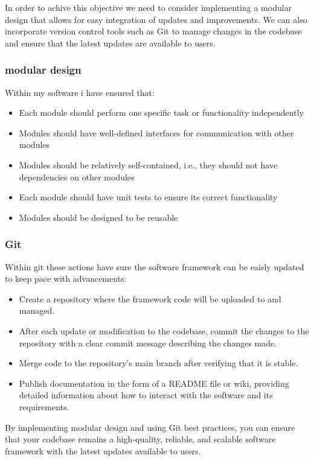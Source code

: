 \documentclass[]{final_report}
\begin{document}
In order to achive this objective we need to consider implementing a modular design that allows for easy integration of updates and improvements. We can also incorporate version control tools such as Git to manage changes in the codebase and ensure that the latest updates are available to users.

\subsubsection{modular design}
Within my software i have ensured that:

\begin{itemize}
    \item Each module should perform one specific task or functionality independently
    \item Modules should have well-defined interfaces for communication with other modules
    \item Modules should be relatively self-contained, i.e., they should not have dependencies on other modules
    \item Each module should have unit tests to ensure its correct functionality
    \item Modules should be designed to be reusable
\end{itemize}


\subsubsection{Git}
Within git these actions have sure the software framework can be eaisly updated to keep pace with advancements:

\begin{itemize}
    \item Create a repository where the framework code will be uploaded to and managed.
    \item After each update or modification to the codebase, commit the changes to the repository with a clear commit message describing the changes made.
    \item Merge code to the repository's main branch after verifying that it is stable.
    \item Publish documentation in the form of a README file or wiki, providing detailed information about how to interact with the software and its requirements.
\end{itemize}

By implementing modular design and using Git best practices, you can ensure that your codebase remains a high-quality, reliable, and scalable software framework with the latest updates available to users.
\clearpage
\end{document}
